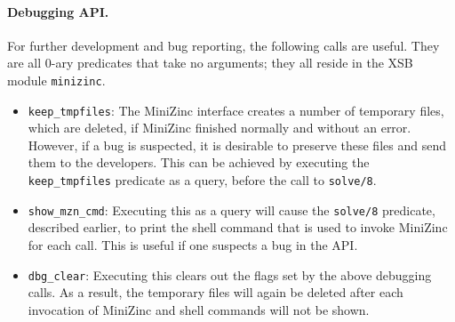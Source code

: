 \paragraph{Debugging API.}
For further development and bug reporting, the following calls are useful.
They are all 0-ary predicates that take no arguments; they all reside in the
XSB module \texttt{minizinc}. 
\begin{itemize}
\item  \texttt{keep\_tmpfiles}: The MiniZinc interface creates a number of
  temporary files, which are deleted, if MiniZinc finished normally and
  without an error. However, if a bug is suspected, it is desirable to
  preserve these files and send them to the developers. 
  This can be achieved by executing the \texttt{keep\_tmpfiles} predicate
  as a query, before the call to \texttt{solve/8}.
\item \texttt{show\_mzn\_cmd}: Executing this as a query will cause the
  \texttt{solve/8} predicate, described earlier, to print the shell command
  that is used to invoke MiniZinc for each call.
  This is useful if one suspects a bug in the API.
\item \texttt{dbg\_clear}: Executing this clears out the flags set by the
  above debugging calls. As a result, the temporary files will again be
  deleted after each invocation of MiniZinc and shell commands will not be
  shown.
\end{itemize}



